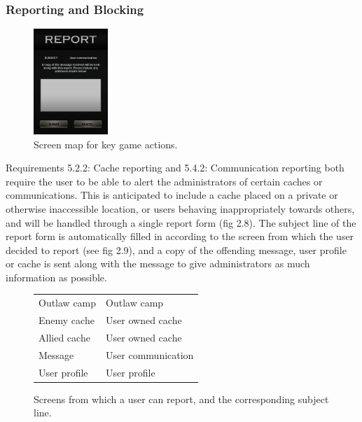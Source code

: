 \subsubsection{Reporting and Blocking}
\begin{figure}
	\vspace{-20pt}
	\begin{center}
	\includegraphics[width=0.25\textwidth]{images/report_mockup}
	\caption{Screen map for key game actions.}
	\label{report_mockup}
	\end{center}
	\vspace{-130pt}
\end{figure}

Requirements 5.2.2: Cache reporting and 5.4.2: Communication reporting both require the user to be able to alert the administrators of certain caches or communications. This is anticipated to include a cache placed on a private or otherwise inaccessible location, or users behaving inappropriately towards others, and will be handled through a single report form (fig 2.8). The subject line of the report form is automatically filled in according to the screen from which the user decided to report (see fig 2.9), and a copy of the offending message, user profile or cache is sent along with the message to give administrators as much information as possible.

\begin{centering}
\begin{figure}[ht]
	\begin{minipage}{0.5\textwidth}
	\begin{tabularx}{\textwidth}{| X | X |}
		\hline
		Outlaw camp & Outlaw camp \\
		Enemy cache & User owned cache \\
		Allied cache & User owned cache \\
		Message & User communication \\
		User profile & User profile \\
		\hline
	\end{tabularx}
	\caption{Screens from which a user can report,
	and the corresponding subject line.}
	\label{report_table}
	\end{minipage}
\end{figure}
\end{centering}

